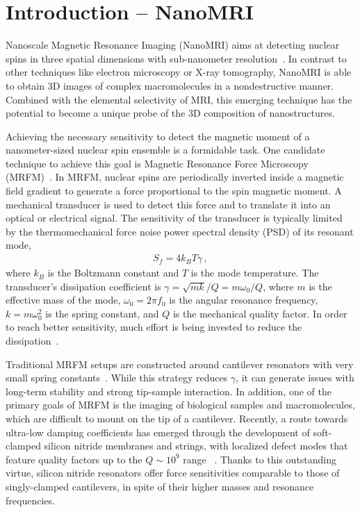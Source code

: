 \section{\label{sec:level1}Introduction -- NanoMRI} \label{sec:spins_intro} 
Nanoscale Magnetic Resonance Imaging (NanoMRI) aims at detecting nuclear spins in three spatial dimensions with sub-nanometer resolution~\cite{Sidles_1991, Degen_2009, Poggio_2010, Mamin_2013, Staudacher_2013, Loretz_2014}. In contrast to other techniques like electron microscopy or X-ray tomography, NanoMRI is able to obtain 3D images of complex macromolecules in a nondestructive manner. Combined with the elemental selectivity of MRI, this emerging technique has the potential to become a unique probe of the 3D composition of nanostructures.

Achieving the necessary sensitivity to detect the magnetic moment of a nanometer-sized nuclear spin ensemble is a formidable task. One candidate technique to achieve this goal is Magnetic Resonance Force Microscopy (MRFM)~\cite{Sidles_1991, Rugar_2004, Degen_2009, Nichol_2012, Nichol_2013, Moores_2015, Rose_2018}. In MRFM, nuclear spins are periodically inverted inside a magnetic field gradient to generate a force proportional to the spin magnetic moment. A mechanical transducer is used to detect this force and to translate it into an optical or electrical signal. The sensitivity of the transducer is typically limited by the thermomechanical force noise power spectral density (PSD) of its resonant mode,
\begin{align} \label{eq:1}
S_f = 4 k_B T \gamma \,,
\end{align}
where $k_B$ is the Boltzmann constant and $T$ is the mode temperature. The transducer's dissipation coefficient is $\gamma = \sqrt{m k}/Q = m \omega_0/Q$, where $m$ is the effective mass of the mode, $\omega_0=2\pi f_0$ is the angular resonance frequency, $k = m\omega_0^2$ is the spring constant, and $Q$ is the mechanical quality factor. In order to reach better sensitivity, much effort is being invested to reduce the dissipation~\cite{Mamin_2001, Moser_2013, Tao_2014, Weber_2016, Reinhardt_2016, Norte_2016, Rossi_2017, Delepinay_2017, Tsaturyan_2017, Heritier_2018, deBonis_2018, Ghadimi_2018}.

Traditional MRFM setups are constructed around cantilever resonators with very small spring constants~\cite{Mamin_2001, Moores_2015, Heritier_2018, Nichol_2012, Nichol_2013, Rose_2018, Rossi_2017}. While this strategy reduces $\gamma$, it can generate issues with long-term stability and strong tip-sample interaction. In addition, one of the primary goals of MRFM is the imaging of biological samples and macromolecules, which are difficult to mount on the tip of a cantilever. Recently, a route towards ultra-low damping coefficients has emerged through the development of soft-clamped silicon nitride membranes and strings, with localized defect modes that feature quality factors up to the $Q \sim 10^9$ range ~\cite{Tsaturyan_2017, Ghadimi_2018, Rossi_2018}. Thanks to this outstanding virtue, silicon nitride resonators offer force sensitivities comparable to those of singly-clamped cantilevers, in spite of their higher masses and resonance frequencies.

